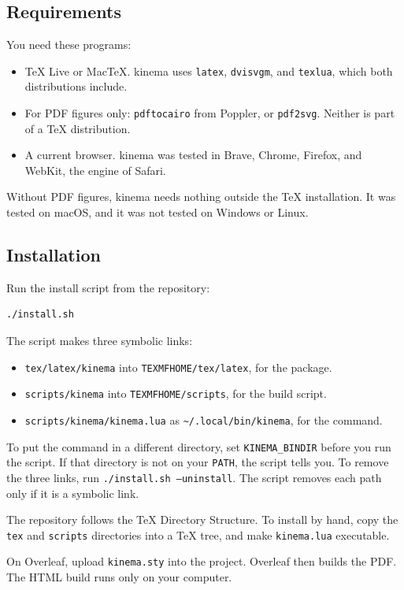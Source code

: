 \documentclass[11pt]{article}
\newcommand{\pkg}{\textsf{kinema}}
\newcommand{\cmd}[1]{\texttt{#1}}
\begin{document}
\subsection{Requirements}

You need these programs:
\begin{itemize}
	\item TeX Live or MacTeX. \pkg{} uses \cmd{latex}, \cmd{dvisvgm}, and
	      \cmd{texlua}, which both distributions include.
	\item For PDF figures only: \cmd{pdftocairo} from Poppler, or \cmd{pdf2svg}.
	      Neither is part of a TeX distribution.
	\item A current browser. \pkg{} was tested in Brave, Chrome, Firefox, and
	      WebKit, the engine of Safari.
\end{itemize}

Without PDF figures, \pkg{} needs nothing outside the TeX installation. It was tested on macOS,
and it was not tested on Windows or Linux.

\subsection{Installation}

Run the install script from the repository:
\begin{lstlisting}
./install.sh
\end{lstlisting}
The script makes three symbolic links:
\begin{itemize}
	\item \cmd{tex/latex/kinema} into \cmd{TEXMFHOME/tex/latex}, for the package.
	\item \cmd{scripts/kinema} into \cmd{TEXMFHOME/scripts}, for the build script.
	\item \cmd{scripts/kinema/kinema.lua} as \cmd{\textasciitilde/.local/bin/kinema},
	      for the command.
\end{itemize}
To put the command in a different directory, set \cmd{KINEMA\_BINDIR} before you
run the script. If that directory is not on your \cmd{PATH}, the script tells you.
To remove the three links, run \cmd{./install.sh --uninstall}. The script removes
each path only if it is a symbolic link.

The repository follows the TeX Directory Structure. To install by hand, copy the
\cmd{tex} and \cmd{scripts} directories into a TeX tree, and make
\cmd{kinema.lua} executable.

On Overleaf, upload \cmd{kinema.sty} into the project. Overleaf then builds the
PDF. The HTML build runs only on your computer.
\end{document}
